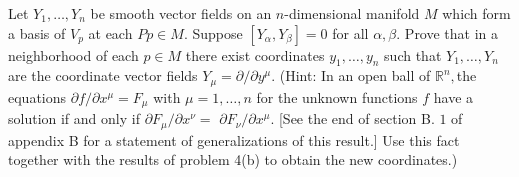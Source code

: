 \begin{problem}
    Let $Y_1,\ldots,Y_n$ be smooth vector fields on an $n$-dimensional manifold $M$ which form a basis of $V_p$ at each $Pp\in M.$ Suppose $[Y_\alpha,Y_\beta]=0$ for all $\alpha,\beta.$ Prove that in a neighborhood of each $p\in M$ there exist coordinates $y_1,\ldots,y_n$ such that $Y_1,\ldots,Y_n$ are the coordinate vector fields $Y_\mu=\partial/\partial y^\mu.$ (Hint: In an open ball of $\mathbb{R} ^n, $the equations $\partial f/\partial x^\mu= F_\mu$ with $\mu= 1,\ldots,n$ for the unknown functions $f$ have a solution if and only if $\partial F_\mu/\partial x^\nu=$ $\partial F_\nu/\partial x^\mu$. [See the end of section B. $1$ of appendix B for a statement of generalizations of this result.] Use this fact together with the results of problem 4(b) to obtain the new coordinates.)
\end{problem}
